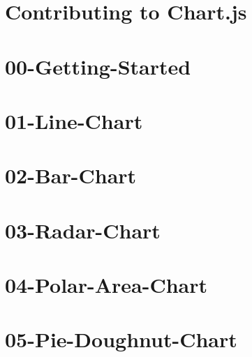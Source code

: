\documentclass[twoside]{book}
\newcommand{\+}{\discretionary{\mbox{\scriptsize$\hookleftarrow$}}{}{}}
\begin{document}
\chapter{Contributing to Chart.\+js}
\label{md_app_web_bower_components__chart_8js__c_o_n_t_r_i_b_u_t_i_n_g}

\chapter{00-\/\+Getting-\/\+Started}
\label{md_app_web_bower_components__chart_8js_docs_00-_getting-_started}

\chapter{01-\/\+Line-\/\+Chart}
\label{md_app_web_bower_components__chart_8js_docs_01-_line-_chart}

\chapter{02-\/\+Bar-\/\+Chart}
\label{md_app_web_bower_components__chart_8js_docs_02-_bar-_chart}

\chapter{03-\/\+Radar-\/\+Chart}
\label{md_app_web_bower_components__chart_8js_docs_03-_radar-_chart}

\chapter{04-\/\+Polar-\/\+Area-\/\+Chart}
\label{md_app_web_bower_components__chart_8js_docs_04-_polar-_area-_chart}

\chapter{05-\/\+Pie-\/\+Doughnut-\/\+Chart}
\label{md_app_web_bower_components__chart_8js_docs_05-_pie-_doughnut-_chart}

\end{document}
